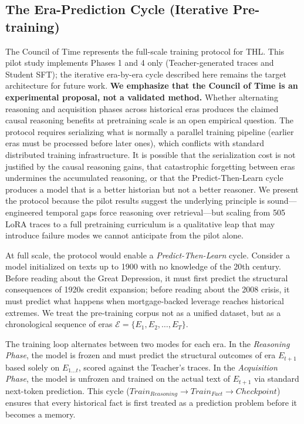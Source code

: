 \documentclass[11pt,a4paper]{article}
\begin{document}
\subsection{The Era-Prediction Cycle (Iterative Pre-training)}
\label{sec:era_cycle}
\label{sec:council}

The Council of Time represents the full-scale training protocol for THL. This pilot study implements Phases 1 and 4 only (Teacher-generated traces and Student SFT); the iterative era-by-era cycle described here remains the target architecture for future work. \textbf{We emphasize that the Council of Time is an experimental proposal, not a validated method.} Whether alternating reasoning and acquisition phases across historical eras produces the claimed causal reasoning benefits at pretraining scale is an open empirical question. The protocol requires serializing what is normally a parallel training pipeline (earlier eras must be processed before later ones), which conflicts with standard distributed training infrastructure. It is possible that the serialization cost is not justified by the causal reasoning gains, that catastrophic forgetting between eras undermines the accumulated reasoning, or that the Predict-Then-Learn cycle produces a model that is a better historian but not a better reasoner. We present the protocol because the pilot results suggest the underlying principle is sound---engineered temporal gaps force reasoning over retrieval---but scaling from 505 LoRA traces to a full pretraining curriculum is a qualitative leap that may introduce failure modes we cannot anticipate from the pilot alone.

At full scale, the protocol would enable a \textit{Predict-Then-Learn} cycle. Consider a model initialized on texts up to 1900 with no knowledge of the 20th century. Before reading about the Great Depression, it must first predict the structural consequences of 1920s credit expansion; before reading about the 2008 crisis, it must predict what happens when mortgage-backed leverage reaches historical extremes. We treat the pre-training corpus not as a unified dataset, but as a chronological sequence of eras $\mathcal{E} = \{E_1, E_2, \ldots, E_T\}$.

The training loop alternates between two modes for each era. In the \textit{Reasoning Phase}, the model is frozen and must predict the structural outcomes of era $E_{t+1}$ based solely on $E_{1 \dots t}$, scored against the Teacher's traces. In the \textit{Acquisition Phase}, the model is unfrozen and trained on the actual text of $E_{t+1}$ via standard next-token prediction. This cycle ($Train_{Reasoning} \rightarrow Train_{Fact} \rightarrow Checkpoint$) ensures that every historical fact is first treated as a prediction problem before it becomes a memory.
\end{document}

